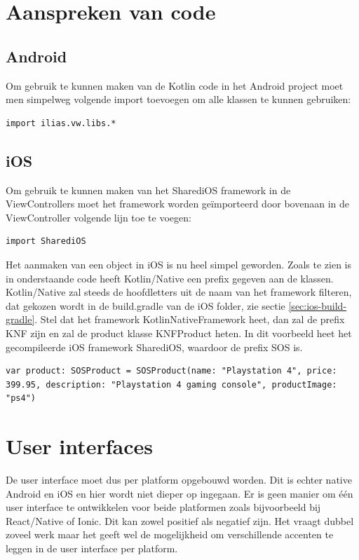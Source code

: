 \section{Aanspreken van code}
\subsection{Android}
Om gebruik te kunnen maken van de Kotlin code in het Android project moet men simpelweg volgende import toevoegen om alle klassen te kunnen gebruiken: 

\begin{lstlisting}
import ilias.vw.libs.*
\end{lstlisting}

\subsection{iOS}
Om gebruik te kunnen maken van het SharediOS framework in de ViewControllers moet het framework worden geïmporteerd door bovenaan in de ViewController volgende lijn toe te voegen:

\begin{lstlisting}
import SharediOS
\end{lstlisting}

Het aanmaken van een object in iOS is nu heel simpel geworden. Zoals te zien is in onderstaande code heeft Kotlin/Native een prefix gegeven aan de klassen. Kotlin/Native zal steeds de hoofdletters uit de naam van het framework filteren, dat gekozen wordt in de build.gradle van de iOS folder, zie sectie \ref{sec:ios-build-gradle}. Stel dat het framework KotlinNativeFramework heet, dan zal de prefix KNF zijn en zal de product klasse KNFProduct heten. In dit voorbeeld heet het gecompileerde iOS framework SharediOS, waardoor de prefix SOS is.

\begin{lstlisting}
var product: SOSProduct = SOSProduct(name: "Playstation 4", price: 399.95, description: "Playstation 4 gaming console", productImage: "ps4")
\end{lstlisting}

\section{User interfaces}
De user interface moet dus per platform opgebouwd worden. Dit is echter native Android en iOS en hier wordt niet dieper op ingegaan. Er is geen manier om één user interface te ontwikkelen voor beide platformen zoals bijvoorbeeld bij React/Native of Ionic. Dit kan zowel positief als negatief zijn. Het vraagt dubbel zoveel werk maar het geeft wel de mogelijkheid om verschillende accenten te leggen in de user interface per platform.

